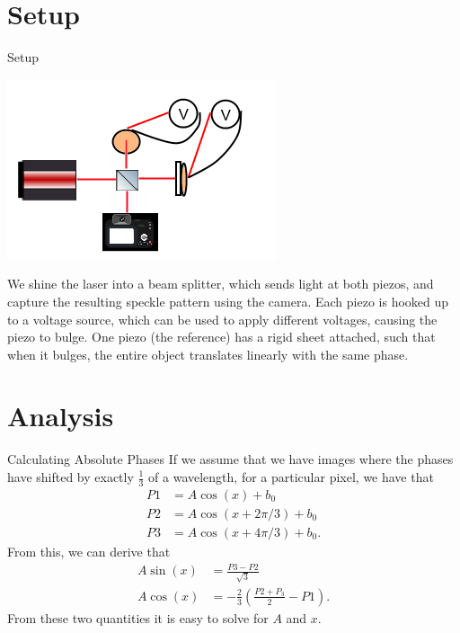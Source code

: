 \documentclass[pdf]{beamer}
\begin{document}
\section{Setup}
\begin{frame}{Setup}
\begin{center}
  \includegraphics[width=0.4\linewidth]{diagram.png}
\end{center}
We shine the laser into a beam splitter, which sends light at both piezos, and capture the resulting speckle pattern using the camera. Each piezo is hooked up to a voltage source, which can be used to apply different voltages, causing the piezo to bulge. One piezo (the reference) has a rigid sheet attached, such that when it bulges, the entire object translates linearly with the same phase.
\end{frame}

\section{Analysis}
\begin{frame}{Calculating Absolute Phases}
\small
If we assume that we have images where the phases have shifted by exactly $\frac13$ of a wavelength, for a particular pixel, we have that
\begin{align*}
P1 &= A\cos (x)+b_0\\
P2 &= A\cos (x+2\pi /3)+b_0\\
P3 &= A\cos (x+4\pi /3)+b_0.
\end{align*}
From this, we can derive that
\begin{align*}
	A\sin(x) &= \frac{P3-P2}{\sqrt 3}\\
	A\cos(x) &= -\frac23 \left(\frac{P2+P_3}{2}-P1\right).
\end{align*}
From these two quantities it is easy to solve for $A$ and $x$.
\end{frame}
\end{document}
